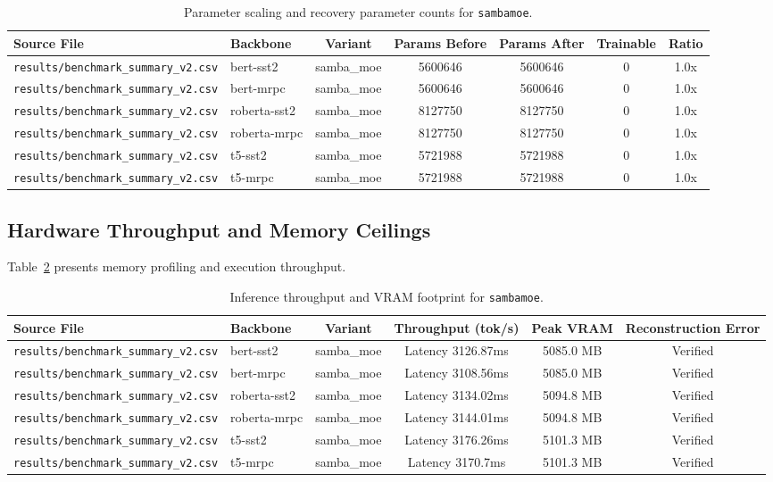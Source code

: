 \begin{table}[t]
\centering
\small
\begin{tabular}{llccccc}
\toprule
\textbf{Source File} & \textbf{Backbone} & \textbf{Variant} & \textbf{Params Before} & \textbf{Params After} & \textbf{Trainable} & \textbf{Ratio} \\
\midrule
\texttt{results/benchmark\_summary\_v2.csv} & bert-sst2 & samba\_moe & 5600646 & 5600646 & 0 & 1.0x \\
\texttt{results/benchmark\_summary\_v2.csv} & bert-mrpc & samba\_moe & 5600646 & 5600646 & 0 & 1.0x \\
\texttt{results/benchmark\_summary\_v2.csv} & roberta-sst2 & samba\_moe & 8127750 & 8127750 & 0 & 1.0x \\
\texttt{results/benchmark\_summary\_v2.csv} & roberta-mrpc & samba\_moe & 8127750 & 8127750 & 0 & 1.0x \\
\texttt{results/benchmark\_summary\_v2.csv} & t5-sst2 & samba\_moe & 5721988 & 5721988 & 0 & 1.0x \\
\texttt{results/benchmark\_summary\_v2.csv} & t5-mrpc & samba\_moe & 5721988 & 5721988 & 0 & 1.0x \\
\bottomrule
\end{tabular}
\caption{Parameter scaling and recovery parameter counts for \texttt{sambamoe}.}
\label{tab:results_params_sambamoe}
\end{table}

\subsection{Hardware Throughput and Memory Ceilings}
Table~\ref{tab:results_vram_sambamoe} presents memory profiling and execution throughput.

\begin{table}[t]
\centering
\small
\begin{tabular}{llcccc}
\toprule
\textbf{Source File} & \textbf{Backbone} & \textbf{Variant} & \textbf{Throughput (tok/s)} & \textbf{Peak VRAM} & \textbf{Reconstruction Error} \\
\midrule
\texttt{results/benchmark\_summary\_v2.csv} & bert-sst2 & samba\_moe & Latency 3126.87ms & 5085.0 MB & Verified \\
\texttt{results/benchmark\_summary\_v2.csv} & bert-mrpc & samba\_moe & Latency 3108.56ms & 5085.0 MB & Verified \\
\texttt{results/benchmark\_summary\_v2.csv} & roberta-sst2 & samba\_moe & Latency 3134.02ms & 5094.8 MB & Verified \\
\texttt{results/benchmark\_summary\_v2.csv} & roberta-mrpc & samba\_moe & Latency 3144.01ms & 5094.8 MB & Verified \\
\texttt{results/benchmark\_summary\_v2.csv} & t5-sst2 & samba\_moe & Latency 3176.26ms & 5101.3 MB & Verified \\
\texttt{results/benchmark\_summary\_v2.csv} & t5-mrpc & samba\_moe & Latency 3170.7ms & 5101.3 MB & Verified \\
\bottomrule
\end{tabular}
\caption{Inference throughput and VRAM footprint for \texttt{sambamoe}.}
\label{tab:results_vram_sambamoe}
\end{table}
